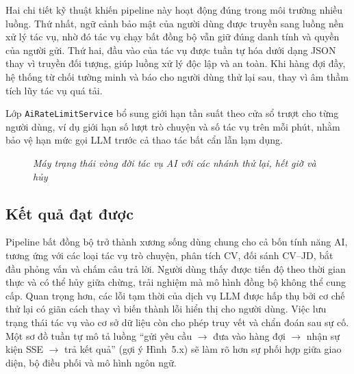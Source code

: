 \documentclass[../DoAn.tex]{subfiles}
\begin{document}
Hai chi tiết kỹ thuật khiến pipeline này hoạt động đúng trong môi trường nhiều luồng. Thứ nhất, ngữ cảnh bảo mật của người dùng được truyền sang luồng nền xử lý tác vụ, nhờ đó tác vụ chạy bất đồng bộ vẫn giữ đúng danh tính và quyền của người gửi. Thứ hai, đầu vào của tác vụ được tuần tự hóa dưới dạng JSON thay vì truyền đối tượng, giúp luồng xử lý độc lập và an toàn. Khi hàng đợi đầy, hệ thống từ chối tường minh và báo cho người dùng thử lại sau, thay vì âm thầm tích lũy tác vụ quá tải.

Lớp \texttt{AiRateLimitService} bổ sung giới hạn tần suất theo cửa sổ trượt cho từng người dùng, ví dụ giới hạn số lượt trò chuyện và số tác vụ trên mỗi phút, nhằm bảo vệ hạn mức gọi LLM trước cả thao tác bất cẩn lẫn lạm dụng.

\begin{figure}[ht]
  \centering
  \caption{\textit{Máy trạng thái vòng đời tác vụ AI với các nhánh thử lại, hết giờ và hủy}}
  \label{fig:ch5-statemachine}
\end{figure}

\subsection{Kết quả đạt được}

Pipeline bất đồng bộ trở thành xương sống dùng chung cho cả bốn tính năng AI, tương ứng với các loại tác vụ trò chuyện, phân tích CV, đối sánh CV--JD, bắt đầu phỏng vấn và chấm câu trả lời. Người dùng thấy được tiến độ theo thời gian thực và có thể hủy giữa chừng, trải nghiệm mà mô hình đồng bộ không thể cung cấp. Quan trọng hơn, các lỗi tạm thời của dịch vụ LLM được hấp thụ bởi cơ chế thử lại có giãn cách thay vì biến thành lỗi hiển thị cho người dùng. Việc lưu trạng thái tác vụ vào cơ sở dữ liệu còn cho phép truy vết và chẩn đoán sau sự cố. Một sơ đồ tuần tự mô tả luồng ``gửi yêu cầu $\rightarrow$ đưa vào hàng đợi $\rightarrow$ nhận sự kiện SSE $\rightarrow$ trả kết quả'' (gợi ý Hình~5.x) sẽ làm rõ hơn sự phối hợp giữa giao diện, bộ điều phối và mô hình ngôn ngữ.
\end{document}
